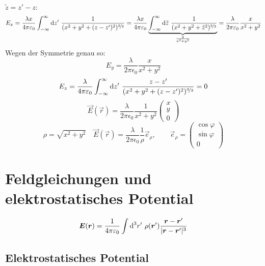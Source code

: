\\
$\tilde{z} = z' - z$:
$$E_x = \frac{\lambda x}{4 \pi \varepsilon_0}\int_{-\infty}^{\infty} \textrm{d} z'\ \frac{1}{(x^2 + y^2 + (z-z')^2)^{\nicefrac{3}{2}}} = \frac{\lambda x}{4 \pi \varepsilon_0}\underbrace{\int_{-\infty}^{\infty}\textrm{d}\tilde{z}\ \frac{1}{(x^2 + y^2 + \tilde{z}^2)^{\nicefrac{3}{2}}}}_{\frac{2}{x^2 + y^2}} = \frac{\lambda}{2 \pi \varepsilon_0} \frac{x}{x^2 + y^2}$$
Wegen der Symmetrie genau so:
$$E_y = \frac{\lambda}{2 \pi \epsilon_0}\frac{x}{x^2 + y^2}$$
$$E_z = \frac{\lambda}{4 \pi \varepsilon_0} \int_{-\infty}^{\infty}\textrm{d} z'\ \frac{z-z'}{(x^2 + y^2 + (z-z')^2)^{\nicefrac{3}{2}}} = 0$$
$$\vec{E}(\vec{r}) = \frac{\lambda}{2 \pi \epsilon_0} \frac{1}{x^2 + y^2} \begin{pmatrix}x\\ y\\ 0\end{pmatrix}$$
$$\rho = \sqrt{x^2 + y^2} \quad \vec{E}(\vec{r}) = \frac{\lambda}{2 \pi \epsilon_0} \frac{1}{\rho}\vec{e}_\rho, \qquad \vec{e}_\rho = \begin{pmatrix}\cos \varphi\\ \sin \varphi\\ 0\end{pmatrix}$$

\section{Feldgleichungen und elektrostatisches Potential}

$$\vec{E}(\vec{r}) = \kq \int \dd^3 r'\ \rho(\vec{r}') \frac{\vec{r} - \vec{r}'}{|\vec{r} - \vec{r}'|^3}$$

\subsection{Elektrostatisches Potential}

